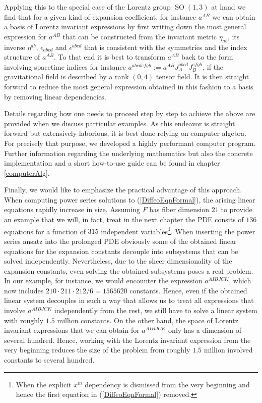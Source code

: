 Applying this to the special case of the Lorentz group $\operatorname{SO}(1,3)$ at hand we find that for a given kind of expansion coefficient, for instance $a^{AB}$ we can obtain a basis of Lorentz invariant expressions by first writing down the most general expression for $a^{AB}$ that can be constructed from the invariant metric $\eta_{ab}$, its inverse $\eta^{ab}$, $\epsilon_{abcd}$ and $\epsilon^{abcd}$ that is consistent with the symmetries and the index structure of $a^{AB}$. To that end it is best to transform $a^{AB}$ back to the form involving spacetime indices for instance $a^{abcdefgh} := a^{AB}J_A^{abcd}J_B^{efgh}$, if the gravitational field is described by a rank $(0,4)$ tensor field. It is then straight forward to reduce the most general expression obtained in this fashion to a basis by removing linear dependencies.

Details regarding how one needs to proceed step by step to achieve the above are provided when we discuss particular examples. As this endeavor is straight forward but extensively laborious, it is best done relying on computer algebra. For precisely that purpose, we developed a highly performant computer program. 
Further information regarding the underlying mathematics but also the concrete implementation and a short how-to-use guide can be found in chapter \ref{computerAlg}. 

Finally, we would like to emphasize the practical advantage of this approach. When computing power series solutions to (\ref{DiffeoEqnFormal}), the arising linear equations rapidly increase in size. Assuming $F$ has fiber dimension $21$ to provide an example that we will, in fact, treat in the next chapter the PDE consits of $136$ equations for a function of $315$ independent variables\footnote{When the explicit $x^m$ dependency is dismissed from the very beginning and hence the first equation in (\ref{DiffeoEqnFormal}) removed.}.  When inserting the power series ansatz into the prolonged PDE obviously some of the obtained linear equations for the expansion constants decouple into subsystems that can be solved independently. Nevertheless, due to the sheer dimensionality of the expansion constants, even solving the obtained subsystems poses a real problem. In our example, for instance, we would encounter the expression $a^{AIBJCK}$, which now includes $210\cdot 211\cdot212/6=1565620$ constants. Hence, even if the obtained linear system decouples in such a way that allows us to treat all expressions that involve $a^{AIBJCK}$ independently from the rest, we still have to solve a linear system with roughly $1.5$ million constants. On the other hand, the space of Lorentz invariant expressions that we can obtain for $a^{AIBJCK}$ only has a dimension of several hundred. Hence, working with the Lorentz invariant expression from the very beginning reduces the size of the problem from roughly $1.5$ million involved constants to several hundred. 

